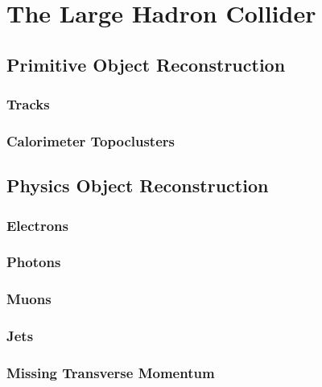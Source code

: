 

\chapter[Physics Object Reconstruction][Top of Page Title]{The Large Hadron Collider}


\section{Primitive Object Reconstruction}

\subsection{Tracks}

\subsection{Calorimeter Topoclusters}

\section{Physics Object Reconstruction}

\subsection{Electrons}

\subsection{Photons}

\subsection{Muons}

\subsection{Jets}

\subsection{Missing Transverse Momentum}
